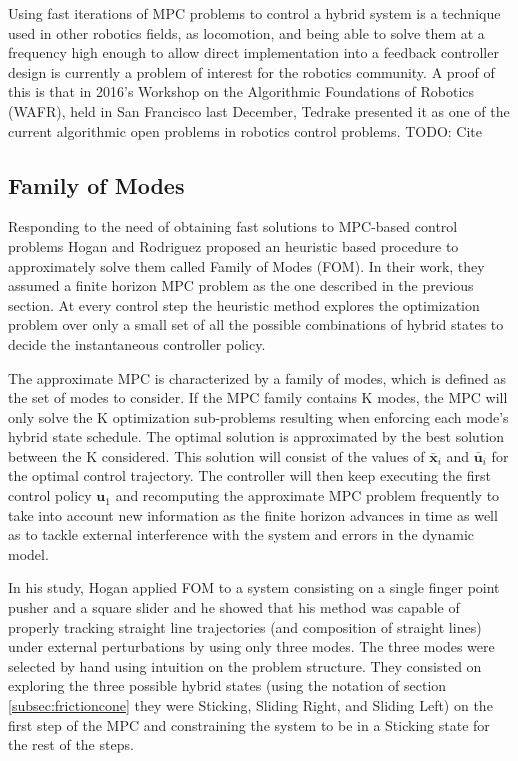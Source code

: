 \documentclass[12,twoside]{TFG-GM}
\theoremstyle{definition}
\theoremstyle{remark}
\newcommand*\diff[1]{\bar{#1}}
\begin{document}
Using fast iterations of MPC problems to control a hybrid system is a technique used in other robotics fields, as locomotion, and being able to solve them at a frequency high enough to allow direct implementation into a feedback controller design is currently a problem of interest for the robotics community. A proof of this is that in 2016's Workshop on the Algorithmic Foundations of Robotics (WAFR), held in San Francisco last December, Tedrake presented it as one of the current algorithmic open problems in robotics control problems. TODO: Cite

\subsection{Family of Modes} 
\label{subsec:fom}

Responding to the need of obtaining fast solutions to MPC-based control problems Hogan and Rodriguez \cite{fom} proposed an heuristic based procedure to approximately solve them called Family of Modes (FOM). In their work, they assumed a finite horizon MPC problem as the one described in the previous section. At every control step the heuristic method explores the optimization problem over only a small set of all the possible combinations of hybrid states to decide the instantaneous controller policy.

The approximate MPC is characterized by a family of modes, which is defined as the set of modes to consider. If the MPC family contains K modes, the MPC will only solve the K optimization sub-problems resulting when enforcing each mode's hybrid state schedule. The optimal solution is approximated by the best solution between the K considered. This solution will consist of the values of $\diff{\textbf{x}}_i$ and $\diff{\textbf{u}}_i$ for the optimal control trajectory. The controller will then keep executing the first control policy $\textbf{u}_1$ and recomputing the approximate MPC problem frequently to take into account new information as the finite horizon advances in time as well as to tackle external interference with the system and errors in the dynamic model.

In his study, Hogan applied FOM to a system consisting on a single finger point pusher and a square slider and he showed that his method was capable of properly tracking straight line trajectories (and composition of straight lines) under external perturbations by using only three modes. The three modes were selected by hand using intuition on the problem structure. They consisted on exploring the three possible hybrid states (using the notation of section \ref{subsec:frictioncone} they were Sticking, Sliding Right, and Sliding Left) on the first step of the MPC and constraining the system to be in a Sticking state for the rest of the steps.
\end{document}
